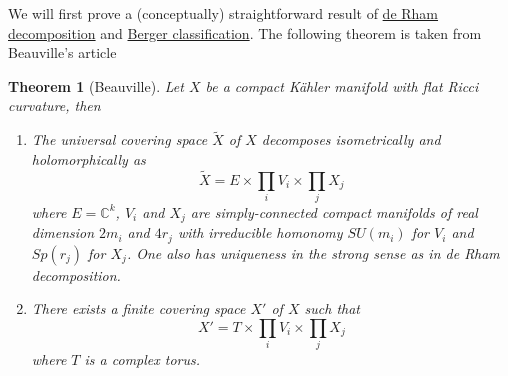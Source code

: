 \documentclass[11pt]{article}
\newtheorem{theorem}{Theorem}
\begin{document}
We will first prove a (conceptually) straightforward result of \href{de-rham-decomposition.org}{de Rham decomposition} and
\href{Berger-remark-complex}{Berger classification}. The following theorem is taken from Beauville's article
\begin{theorem}[Beauville]
\label{thm:beauville-1}
\label{orgdf9aa02}
Let \(X\) be a compact Kähler manifold with flat Ricci curvature, then
\begin{enumerate}
\item The universal covering space \(\tilde X\) of \(X\) decomposes isometrically and holomorphically as
\[\tilde X = E \times\prod_i V_i\times \prod_j X_j\] where \(E = \mathbb{C}^k\), \(V_i\) and \(X_j\)
are simply-connected compact manifolds of real dimension \(2m_i\) and \(4r_j\) with irreducible homonomy
\(SU(m_i)\) for \(V_i\) and \(Sp(r_j)\) for \(X_j\). One also has uniqueness in the strong sense as in de
Rham decomposition.
\item There exists a finite covering space \(X'\) of \(X\) such that \[ X' = T\times \prod_i V_i
   \times \prod_j X_j\] where \(T\) is a complex torus.
\end{enumerate}
\end{theorem}
\end{document}
